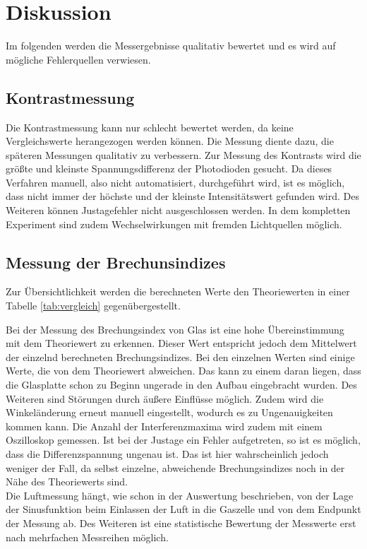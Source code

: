 \section{Diskussion}
Im folgenden werden die Messergebnisse qualitativ bewertet und es wird auf
mögliche Fehlerquellen verwiesen.
\subsection{Kontrastmessung}
Die Kontrastmessung kann nur schlecht bewertet werden, da keine Vergleichswerte
herangezogen werden können. Die Messung diente dazu, die späteren Messungen
qualitativ zu verbessern. Zur Messung des Kontrasts wird die größte und kleinste
Spannungsdifferenz der Photodioden gesucht. Da dieses Verfahren manuell, also
nicht automatisiert, durchgeführt wird, ist es möglich, dass nicht immer der
höchste und der kleinste Intensitätswert gefunden wird. Des Weiteren können Justagefehler nicht
ausgeschlossen werden. In dem kompletten Experiment sind zudem
Wechselwirkungen mit fremden Lichtquellen möglich.

\subsection{Messung der Brechunsindizes}
Zur Übersichtlichkeit werden die berechneten Werte den Theoriewerten in einer
Tabelle \ref{tab:vergleich} gegenübergestellt.



Bei der Messung des Brechungsindex von Glas ist eine hohe Übereinstimmung mit
dem Theoriewert zu erkennen. Dieser Wert entspricht jedoch dem Mittelwert der
einzelnd berechneten Brechungsindizes. Bei den einzelnen Werten sind einige
Werte, die von dem Theoriewert abweichen. Das kann zu einem daran liegen, dass
die Glasplatte schon zu Beginn ungerade in den Aufbau eingebracht wurden. Des
Weiteren sind Störungen durch äußere Einflüsse möglich. Zudem wird die
Winkeländerung erneut manuell eingestellt, wodurch es zu Ungenauigkeiten
kommen kann.
Die Anzahl der Interferenzmaxima wird zudem mit einem
Oszilloskop gemessen. Ist bei der Justage ein Fehler aufgetreten, so ist es
möglich, dass die Differenzspannung ungenau ist. Das ist hier wahrscheinlich
jedoch weniger der Fall, da selbst einzelne, abweichende Brechungsindizes noch
in der Nähe des Theoriewerts sind. \\

Die Luftmessung hängt, wie schon in der Auswertung beschrieben, von der Lage
der Sinusfunktion beim Einlassen der Luft in die Gaszelle und von dem
Endpunkt der Messung ab. Des Weiteren
ist eine statistische Bewertung der Messwerte erst nach mehrfachen
Messreihen möglich.
